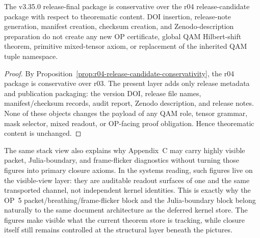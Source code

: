\begin{proposition}
\label{prop:v3350-release-final-conservativity}
The v3.35.0 release-final package is conservative over the r04 release-candidate package with respect to theorematic content.  DOI insertion, release-note generation, manifest creation, checksum creation, and Zenodo-description preparation do not create any new OP certificate, global QAM Hilbert-shift theorem, primitive mixed-tensor axiom, or replacement of the inherited QAM tuple namespace.
\end{proposition}

\begin{proof}
By Proposition~\ref{prop:r04-release-candidate-conservativity}, the r04 package is conservative over r03.  The present layer adds only release metadata and publication packaging: the version DOI, release file names, manifest/checksum records, audit report, Zenodo description, and release notes.  None of these objects changes the payload of any QAM role, tensor grammar, mask selector, mixed readout, or OP-facing proof obligation.  Hence theorematic content is unchanged.
\end{proof}


\begin{remark}\label{rem:qam-vm-os-visuals}
The same stack view also explains why Appendix~C may carry highly visible packet, Julia-boundary, and frame-flicker diagnostics without turning those figures into primary closure axioms. In the systems reading, such figures live on the visible-view layer: they are auditable readout surfaces of one and the same transported channel, not independent kernel identities. This is exactly why the OP~5 packet/breathing/frame-flicker block and the Julia-boundary block belong naturally to the same document architecture as the deferred kernel store. The figures make visible what the current theorem store is tracking, while closure itself still remains controlled at the structural layer beneath the pictures.
\end{remark}


